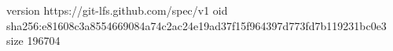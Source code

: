 version https://git-lfs.github.com/spec/v1
oid sha256:e81608c3a8554669084a74c2ac24e19ad37f15f964397d773fd7b119231bc0e3
size 196704
